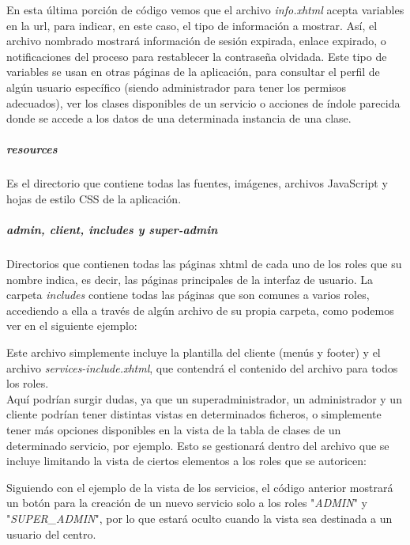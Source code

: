 

En esta última porción de código vemos que el archivo \textit{info.xhtml} acepta variables en la url, para indicar, en este caso, el tipo de información a mostrar. Así, el archivo nombrado mostrará información de sesión expirada, enlace expirado, o notificaciones del proceso para restablecer la contraseña olvidada. Este tipo de variables se usan en otras páginas de la aplicación, para consultar el perfil de algún usuario específico (siendo administrador para tener los permisos adecuados), ver los clases disponibles de un servicio o acciones de índole parecida donde se accede a los datos de una determinada instancia de una clase. 


\subparagraph{\textit{resources}}

Es el directorio que contiene todas las fuentes, imágenes, archivos JavaScript y hojas de estilo CSS de la aplicación. 


\subparagraph{\textit{admin, client, includes }y \textit{super-admin}}

Directorios que contienen todas las páginas xhtml de cada uno de los roles que su nombre indica, es decir, las páginas principales de la interfaz de usuario. La carpeta \textit{includes} contiene todas las páginas que son comunes a varios roles, accediendo a ella a través de algún archivo de su propia carpeta, como podemos ver en el siguiente ejemplo: 



Este archivo simplemente incluye la plantilla del cliente (menús y footer) y el archivo \textit{services-include.xhtml}, que contendrá el contenido del archivo para todos los roles.\\ 

Aquí podrían surgir dudas, ya que un superadministrador, un administrador y un cliente podrían tener distintas vistas en determinados ficheros, o simplemente tener más opciones disponibles en la vista de la tabla de clases de un determinado servicio, por ejemplo. Esto se gestionará dentro del archivo que se incluye limitando la vista de ciertos elementos a los roles que se autoricen: 



Siguiendo con el ejemplo de la vista de los servicios, el código anterior mostrará un botón para la creación de un nuevo servicio solo a los roles "\textit{ADMIN}" y "\textit{SUPER\_ADMIN}", por lo que estará oculto cuando la vista sea destinada a un usuario del centro. \\


